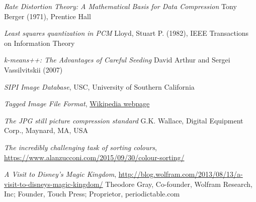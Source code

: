 \documentclass{report}
\begin{document}
\clearpage

\begin{thebibliography}{9}
		
		\textit{Rate Distortion Theory: A Mathematical Basis for Data Compression}
		Tony Berger (1971), Prentice Hall
		
		\textit{Least squares quantization in PCM}
		Lloyd, Stuart P. (1982), IEEE Transactions on Information Theory
		
		\textit{k-means++: The Advantages of Careful Seeding}
		David Arthur and Sergei Vassilvitskii (2007)
		
		\textit{SIPI Image Database},
		USC, University of Southern California
	
		\textit{Tagged Image File Format},
		\href{https://it.wikipedia.org/wiki/Tagged_Image_File_Format}{Wikipedia webpage}
	
		\textit{The JPG still picture compression standard}
		G.K. Wallace, Digital Equipment Corp., Maynard, MA, USA
		
		\textit{The incredibly challenging task of sorting colours},
		\href{https://www.alanzucconi.com/2015/09/30/colour-sorting/}{https://www.alanzucconi.com/2015/09/30/colour-sorting/}
	
		\textit{A Visit to Disney’s Magic Kingdom},
		\href{	http://blog.wolfram.com/2013/08/13/a-visit-to-disneys-magic-kingdom/}{	http://blog.wolfram.com/2013/08/13/a-visit-to-disneys-magic-kingdom/}
		Theodore Gray, Co-founder, Wolfram Research, Inc; Founder, Touch Press; Proprietor, periodictable.com 
	
	
\end{thebibliography}
\end{document}
